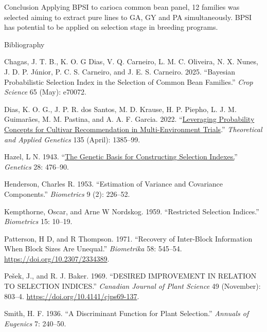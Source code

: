 \documentclass[
  ignorenonframetext,
  aspectratio=169,
]{beamer}
\newlength{\cslhangindent}
\newenvironment{CSLReferences}[2] %
 {\begin{list}{}{%
  \setlength{\itemindent}{0pt}
  \setlength{\leftmargin}{0pt}
  \setlength{\parsep}{0pt}
  \ifodd #1
   \setlength{\leftmargin}{\cslhangindent}
   \setlength{\itemindent}{-1\cslhangindent}
  \fi
  \setlength{\itemsep}{#2\baselineskip}}}
 {\end{list}}
\begin{document}
\begin{frame}{Conclusion}
\label{conclusion}
Applying BPSI to carioca common bean panel, 12 families was selected
aiming to extract pure lines to GA, GY and PA simultaneously. BPSI has
potential to be applied on selection stage in breeding programs.
\end{frame}

\begin{frame}{Bibliography}
\label{bibliography}
\label{refs}
\begin{CSLReferences}{1}{0}
Chagas, J. T. B., K. O. G Dias, V. Q. Carneiro, L. M. C. Oliveira, N. X.
Nunes, J. D. P. Júnior, P. C. S. Carneiro, and J. E. S. Carneiro. 2025.
{``Bayesian Probabilistic Selection Index in the Selection of Common
Bean Families.''} \emph{Crop Science} 65 (May): e70072.

Dias, K. O. G., J. P. R. dos Santos, M. D. Krause, H. P. Piepho, L. J.
M. Guimarães, M. M. Pastina, and A. A. F. Garcia. 2022.
{``\href{https://www.ncbi.nlm.nih.gov/pubmed/35192008}{Leveraging
Probability Concepts for Cultivar Recommendation in Multi-Environment
Trials}.''} \emph{Theoretical and Applied Genetics} 135 (April):
1385--99.

Hazel, L N. 1943.
{``\href{https://www.ncbi.nlm.nih.gov/pubmed/17247099}{The Genetic Basis
for Constructing Selection Indexes.}''} \emph{Genetics} 28: 476--90.

Henderson, Charles R. 1953. {``Estimation of Variance and Covariance
Components.''} \emph{Biometrics} 9 (2): 226--52.

Kempthorne, Oscar, and Arne W Nordskog. 1959. {``Restricted Selection
Indices.''} \emph{Biometrics} 15: 10--19.

Patterson, H D, and R Thompson. 1971. {``Recovery of Inter-Block
Information When Block Sizes Are Unequal.''} \emph{Biometrika} 58:
545--54. \url{https://doi.org/10.2307/2334389}.

Pešek, J., and R. J. Baker. 1969. {``DESIRED IMPROVEMENT IN RELATION TO
SELECTION INDICES.''} \emph{Canadian Journal of Plant Science} 49
(November): 803--4. \url{https://doi.org/10.4141/cjps69-137}.

Smith, H. F. 1936. {``A Discriminant Function for Plant Selection.''}
\emph{Annuals of Eugenics} 7: 240--50.

\end{CSLReferences}
\end{frame}
\end{document}
